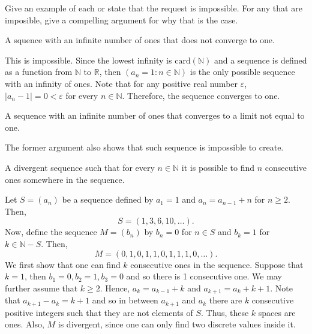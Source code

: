 \documentclass[12pt]{article}
\newcommand{\N}{\mathbb{N}}
\newcommand{\R}{\mathbb{R}}
\newenvironment{problem}[2][Problem]{\begin{trivlist} \item[\hskip \labelsep {\bfseries #1}\hskip \labelsep {\bfseries #2.}]}{\end{trivlist}}
\newenvironment{solution}[1][Solution]{\begin{trivlist} \item[\hskip \labelsep {\bfseries #1}]}{\end{trivlist}}
\begin{document}
    \begin{problem}{2.2.4}
      Give an example of each or state that the request is impossible. For any that are imposible, give a compelling argument for why that is the case.
      \begin{enumerate}[label=(\alph*)]
	\item A squence with an infinite number of ones that does not converge to one.
    \begin{solution}
      This is impossible. Since the lowest infinity is $\mathrm{card}(\N)$ and a sequence is defined as a function from $\N$ to $\R$, then $(a_{n} = 1: n\in \N)$ is the only possible sequence with an infinity of ones. Note that for any positive real number $\varepsilon$, $|a_{n} -1| = 0 < \varepsilon$ for every $n\in\N$. Therefore, the sequence converges to one.
    \end{solution}
  \item A sequence with an infinite number of ones that converges to a limit not equal to one.
    \begin{solution}
      The former argument also shows that such sequence is impossible to create.
    \end{solution}
  \item A divergent sequence such that for every $n\in \N$ it is possible to find $n$ consecutive ones somewhere in the sequence.
    \begin{solution}
      Let $S=(a_{n})$ be a sequence defined by $a_{1}=1$ and $a_{n}=a_{n-1}+n$ for $n\geq 2$. Then,
    \begin{equation*}
      S=(1,3,6,10,\dots).
    \end{equation*}
    Now, define the sequence $M=(b_{n})$ by $b_{n} = 0$ for $n\in S$ and $b_{k}=1$ for $k\in \N-S$. Then, 
    \begin{equation*}
      M=(0,1,0,1,1,0,1,1,1,0,\dots).
    \end{equation*}
        We first show that one can find $k$ consecutive ones in the sequence. Suppose that $k=1$, then $b_{1}=0, b_{2}=1,b_{3}=0$  and so there is 1 consecutive one. We may further assume that $k\geq 2$. Hence, $a_{k}=a_{k-1}+k$ and $a_{k+1}=a_{k}+k+1$. Note that $a_{k+1}-a_{k} = k+1$ and so in between $a_{k+1}$ and $a_{k}$ there are $k$ consecutive positive integers such that they are not elements of $S$. Thus, these $k$ spaces are ones. Also, $M$ is divergent, since one can only find two discrete values inside it.
    \end{solution}
    \end{enumerate}
    \end{problem}
\end{document}
